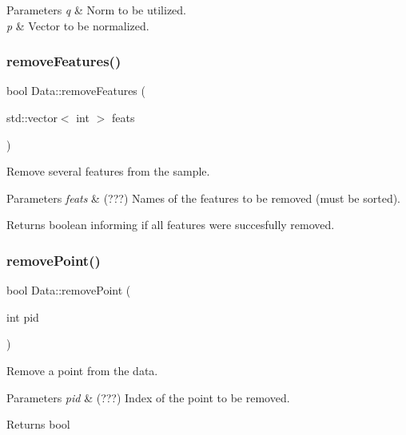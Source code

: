 \begin{DoxyParams}{Parameters}
{\em q} & Norm to be utilized. \\
\hline
{\em p} & Vector to be normalized. \\
\hline
\end{DoxyParams}
\mbox{\label{class_data_a0e0136f31687452ff10b489f8804ceb8}} 
\subsubsection{\texorpdfstring{remove\+Features()}{removeFeatures()}}
{\footnotesize\ttfamily bool Data\+::remove\+Features (\begin{DoxyParamCaption}\item[{std\+::vector$<$ int $>$}]{feats }\end{DoxyParamCaption})}



Remove several features from the sample. 


\begin{DoxyParams}{Parameters}
{\em feats} & (???) Names of the features to be removed (must be sorted). \\
\hline
\end{DoxyParams}
\begin{DoxyReturn}{Returns}
boolean informing if all features were succesfully removed. 
\end{DoxyReturn}
\mbox{\label{class_data_ad927494a13a5018ff3644212d7234a03}} 
\subsubsection{\texorpdfstring{remove\+Point()}{removePoint()}}
{\footnotesize\ttfamily bool Data\+::remove\+Point (\begin{DoxyParamCaption}\item[{int}]{pid }\end{DoxyParamCaption})}



Remove a point from the data. 


\begin{DoxyParams}{Parameters}
{\em pid} & (???) Index of the point to be removed. \\
\hline
\end{DoxyParams}
\begin{DoxyReturn}{Returns}
bool 
\end{DoxyReturn}
\mbox{\label{class_data_a6cc376e614e5440061c66833e1c8d30a}} 
